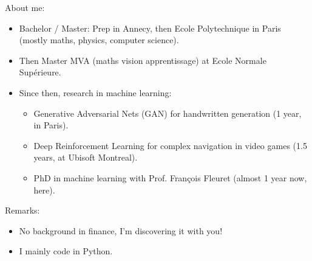 \begin{frame}
    About me: \pause
    \begin{itemize}
        \item Bachelor / Master: Prep in Annecy, then Ecole Polytechnique in Paris (mostly maths, physics, computer science). \pause
        \item Then Master MVA (maths vision apprentissage) at Ecole Normale Supérieure. \pause
        \item Since then, research in machine learning: \pause
        \begin{itemize}
            \item Generative Adversarial Nets (GAN) for handwritten generation (1 year, in Paris). \pause
            \item Deep Reinforcement Learning for complex navigation in video games (1.5 years, at Ubisoft Montreal). \pause
            \item PhD in machine learning with Prof. François Fleuret (almost 1 year now, here). \pause
        \end{itemize}
    \end{itemize}
    \vspace{1cm}
    Remarks: \pause
    \begin{itemize}
        \item No background in finance, I'm discovering it with you! \pause
        \item I mainly code in Python.
    \end{itemize}
\end{frame}